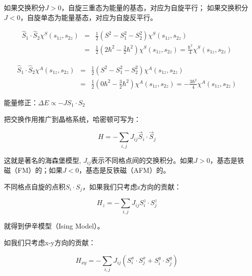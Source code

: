 如果交换积分$J>0$，自旋三重态为能量的基态，对应为自旋平行；
如果交换积分$J<0$，自旋单态为能量基态，对应为自旋反平行。

\begin{eqnarray*}
\widehat S_1  \cdot \widehat S_2 \chi ^S \left( {s_{1z} ,s_{2z} } \right) & = & \frac{1}{2}\left( {S^2  - S_1^2  - S_2^2 } \right)\chi ^S \left( {s_{1z} ,s_{2z} } \right) \\
{} & = & \frac{1}{2}\left( {2\hbar ^2  - \frac{3}{2}\hbar ^2 } \right)\chi ^S \left( {s_{1z} ,s_{2z} } \right) = \frac{{\hbar ^2 }}{4}\chi ^S \left( {s_{1z} ,s_{2z} } \right)
\end{eqnarray*}

\begin{eqnarray*}
\widehat S_1  \cdot \widehat S_2 \chi ^A \left( {s_{1z} ,s_{2z} } \right) & = & \frac{1}{2}\left( {S^2  - S_1^2  - S_2^2 } \right)\chi ^A \left( {s_{1z} ,s_{2z} } \right) \\
{} & = & \frac{1}{2}\left( {0\hbar ^2  - \frac{3}{2}\hbar ^2 } \right)\chi ^A \left( {s_{1z} ,s_{2z} } \right) =  - \frac{{3\hbar ^2 }}{4}\chi ^A \left( {s_{1z} ,s_{2z} } \right)
\end{eqnarray*}

能量修正：$\Delta E \propto  - JS_1  \cdot S_2 $

把交换作用推广到晶格系统，哈密顿可写为：

\begin{equation}\label{heisenberg model}
H =  - \sum\limits_{i,j} {J_{ij} \vec S_i  \cdot \vec S_j }
\end{equation}




这就是著名的海森堡模型, $J_{ij} $表示不同格点间的交换积分。如果$J>0$，基态是铁磁（FM）的；如果$J<0$，基态是反铁磁（AFM）的。

不同格点自旋的点积$S_i  \cdot S_j $，如果我们只考虑z方向的贡献：

\begin{equation}\label{ising model}
H_z  =  - \sum\limits_{i,j} {J_{ij} S_i^z  \cdot S_j^z }
\end{equation}

就得到伊辛模型（Ising Model）。



如我们只考虑x-y方向的贡献：

\begin{equation}\label{xy model}
H_{xy}  =  - \sum\limits_{i,j} {J_{ij} \left( {S_i^x  \cdot S_j^x  + S_i^y  \cdot S_j^y } \right)}
\end{equation}


